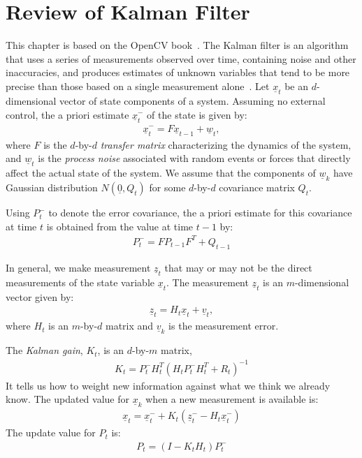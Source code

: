 \chapter{Review of Kalman Filter}\label{app:kalman}
This chapter is based on the OpenCV book~\cite{Opencv}. The Kalman filter is an
algorithm that uses a series of measurements observed over time, containing
noise and other inaccuracies, and produces estimates of unknown variables that
tend to be more precise than those based on a single measurement
alone~\cite{kalman14}.
Let $\underline{x}_t$ be an $d$-dimensional vector of state components of a
system.
Assuming no external control, the a priori estimate $
\underline{x}_t^-$ of the state is
given by:
\begin{align*}
\underline{x}_t^- = F\underline{x}_{t - 1} + \underline{w}_t,
\end{align*}
where $F$ is the $d$-by-$d$ \textit{transfer matrix} characterizing the
dynamics of the system, and $\underline{w}_t$ is the \textit{process noise}
associated with random events or forces that directly affect the actual state of
the system. We assume that the components of $\underline{w}_k$ have Gaussian
distribution $N(\underline{0}, Q_t)$ for some $d$-by-$d$ covariance matrix $Q_t$.

Using $P_t^-$ to denote the error covariance, the a priori estimate for this
covariance at time $t$ is obtained from the value at time $t - 1$ by:
\begin{align*}
P_t^- = FP_{t - 1}F^T + Q_{t - 1}
\end{align*}

In general, we make measurement $\underline{z}_t$ that may or may not be the
direct measurements of the state variable $\underline{x}_t$. The measurement
$\underline{z}_t$ is an $m$-dimensional vector given by:
\begin{align*}
\underline{z}_t = H_t\underline{x}_t + \underline{v}_t,
\end{align*}
where $H_t$ is an $m$-by-$d$ matrix and $\underline{v}_k$ is the measurement
error.

The \textit{Kalman gain}, $K_t$, is an $d$-by-$m$ matrix,  
\begin{align*}
K_t = P_t^-H_t^T(H_tP_t^-H_t^T + R_t)^{-1}
\end{align*}
It tells us how to
weight new information against what we think we already know.
The updated value for $\underline{x}_k$ when a new measurement is available is:
\begin{align*}
\underline{x}_t = \underline{x}_t^- + K_t(\underline{z}_t^- -
H_t\underline{x}_t^-)
\end{align*}
The update value for $P_t$ is:
\begin{align*}
P_t = (I - K_tH_t)P_t^-
\end{align*}


